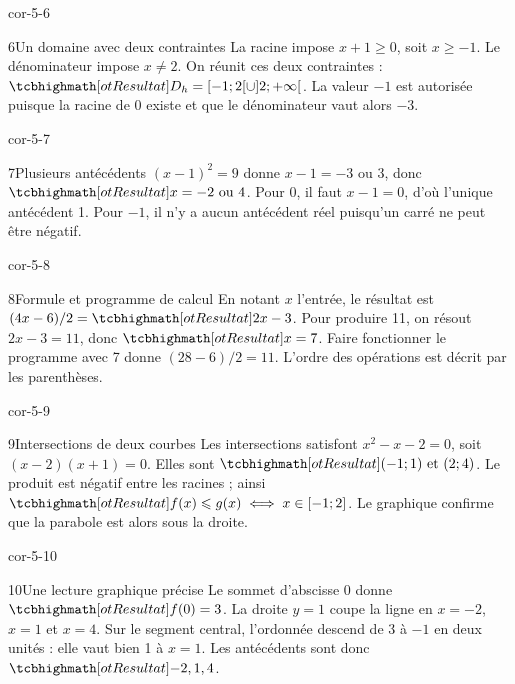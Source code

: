 \begin{blocLivre}{cor-5-6}
\begin{corrige}{6}{Un domaine avec deux contraintes}
La racine impose $x+1\ge0$, soit $x\ge-1$. Le dénominateur impose $x\ne2$. On réunit ces deux contraintes : $\res{D_h=[-1;2[\cup]2;+\infty[}$. La valeur $-1$ est autorisée puisque la racine de 0 existe et que le dénominateur vaut alors $-3$.
\end{corrige}
\end{blocLivre}
\begin{blocLivre}{cor-5-7}
\begin{corrige}{7}{Plusieurs antécédents}
$(x-1)^2=9$ donne $x-1=-3$ ou 3, donc $\res{x=-2\text{ ou }4}$. Pour 0, il faut $x-1=0$, d’où l’unique antécédent 1. Pour $-1$, il n’y a aucun antécédent réel puisqu’un carré ne peut être négatif.
\label{fig-cor-5-7}
\end{corrige}
\end{blocLivre}
\begin{blocLivre}{cor-5-8}
\begin{corrige}{8}{Formule et programme de calcul}
En notant $x$ l’entrée, le résultat est $(4x-6)/2=\res{2x-3}$. Pour produire 11, on résout $2x-3=11$, donc $\res{x=7}$. Faire fonctionner le programme avec 7 donne $(28-6)/2=11$. L’ordre des opérations est décrit par les parenthèses.
\end{corrige}
\end{blocLivre}
\begin{blocLivre}{cor-5-9}
\begin{corrige}{9}{Intersections de deux courbes}
Les intersections satisfont $x^2-x-2=0$, soit $(x-2)(x+1)=0$. Elles sont $\res{(-1;1)\text{ et }(2;4)}$. Le produit est négatif entre les racines ; ainsi $\res{f(x)\le g(x)\iff x\in[-1;2]}$. Le graphique confirme que la parabole est alors sous la droite.
\label{fig-cor-5-9}
\end{corrige}
\end{blocLivre}
\begin{blocLivre}{cor-5-10}
\begin{corrige}{10}{Une lecture graphique précise}
Le sommet d’abscisse 0 donne $\res{f(0)=3}$. La droite $y=1$ coupe la ligne en $x=-2$, $x=1$ et $x=4$. Sur le segment central, l’ordonnée descend de 3 à $-1$ en deux unités : elle vaut bien 1 à $x=1$. Les antécédents sont donc $\res{-2,1,4}$.
\label{fig-cor-5-10}
\end{corrige}
\end{blocLivre}
